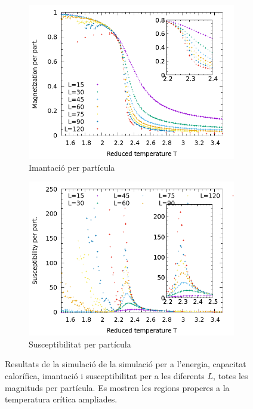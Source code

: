 \documentclass[a4paper]{article}
\begin{document}
\begin{figure}[H]
\begin{subfigure}{.45\textwidth}
        \includegraphics[width=\textwidth]{plot-m.png}
        \caption{Imantació per partícula}
        \label{fig:plot-m}
    \end{subfigure}
    \begin{subfigure}{.45\textwidth}
        \centering
        \includegraphics[width=\textwidth]{plot-x.png}
        \caption{Susceptibilitat per partícula}
        \label{fig:plot-x}
    \end{subfigure}
    \caption{Resultats de la simulació de la simulació per a l'energia, capacitat calorífica, imantació i susceptibilitat per a les diferents $L$, totes les magnituds per partícula. Es mostren les regions properes a la temperatura crítica ampliades.}
\label{fig:plot}
\end{figure}
\end{document}
